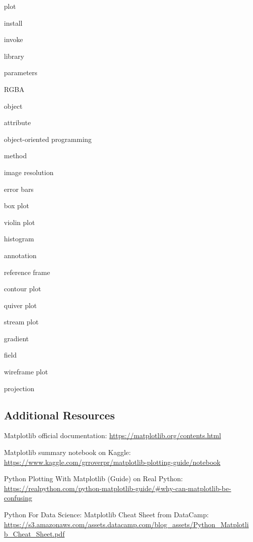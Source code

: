 \documentclass{book}
\newenvironment{key_terms}{\begin{multicols}{3}}{\end{multicols}} %
\begin{document}
    
        \begin{key_terms}
        plot

install

invoke

library

parameters

RGBA

object

attribute

object-oriented programming

method

image resolution

error bars

box plot

violin plot

histogram

annotation

reference frame

contour plot

quiver plot

stream plot

gradient

field

wireframe plot

projection
        \end{key_terms}

    




    
        \subsection{Additional Resources}\label{additional-resources}
    




    
        Matplotlib official documentation:
\url{https://matplotlib.org/contents.html}

Matplotlib summary notebook on Kaggle:
\url{https://www.kaggle.com/grroverpr/matplotlib-plotting-guide/notebook}

Python Plotting With Matplotlib (Guide) on Real Python:
\url{https://realpython.com/python-matplotlib-guide/\#why-can-matplotlib-be-confusing}

Python For Data Science: Matplotlib Cheat Sheet from DataCamp:
\url{https://s3.amazonaws.com/assets.datacamp.com/blog_assets/Python_Matplotlib_Cheat_Sheet.pdf}
    
\end{document}
